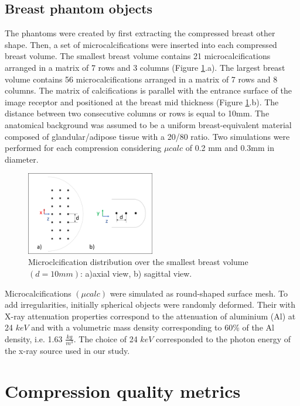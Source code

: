 \subsection{Breast phantom objects}

The phantoms were created by first extracting the compressed breast other shape. Then, a set of microcalcifications were inserted into each compressed breast volume. The smallest breast volume contains 21 microcalcifications arranged in a matrix of 7 rows and 3 columns (Figure \ref{fig:microcalcifications}.a). The largest breast volume contains 56 microcalcifications arranged in a matrix of 7 rows and 8 columns. The matrix of calcifications is parallel with the entrance surface of the image receptor and positioned at the breast mid thickness (Figure \ref{fig:microcalcifications}.b). The distance between two consecutive columns or rows is equal to 10mm. The anatomical background was assumed to be a uniform breast-equivalent material composed of glandular/adipose tissue with a 20/80 ratio. Two simulations were performed for each compression considering $\mu calc$ of 0.2 mm and 0.3mm in diameter.

\begin{figure}[!h]
\centering
\includegraphics[width=0.5\textwidth,keepaspectratio]{figures/microcalcifications.png} 
\caption{Microclcification distribution over the smallest breast volume $(d=10mm)$: a)axial view, b) sagittal view.}\label{fig:microcalcifications}
\end{figure}


Microcalcifications $(\mu calc)$ were simulated as round-shaped surface mesh. To add irregularities, initially spherical objects were randomly deformed. Their with X-ray attenuation properties correspond to the attenuation of aluminium (Al) at 24 $keV$ and with a volumetric mass density corresponding to 60\% of the Al density, i.e. 1.63 $\frac{kg}{m^3}$.  The choice of 24 $keV$ corresponded to the photon energy of the x-ray source used in our study. 



\section{Compression quality metrics}\label{section:compressionqualitymetrics}

